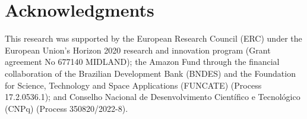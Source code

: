 \section*{Acknowledgments}
This research was supported by the European Research Council (ERC) under the European Union's Horizon 2020 research and innovation program (Grant agreement No 677140 MIDLAND); the Amazon Fund through the financial collaboration of the Brazilian Development Bank (BNDES) and the Foundation for Science, Technology and Space Applications (FUNCATE) (Process 17.2.0536.1); and Conselho Nacional de Desenvolvimento Científico e Tecnológico (CNPq) (Process 350820/2022-8).



\address{Rolf Simoes\\
  National Institute for Space Research (INPE)\\
  Avenida dos Astronautas, 1758, 12227-010, Sao Jose dos Campos\\
  Brazil\\
  ORCiD: \url{https://orcid.org/0000-0003-0953-4132}\\
  }

\address{Alber Sanchez\\
  National Institute for Space Research (INPE)\\
   Avenida dos Astronautas, 1758, 12227-010, Sao Jose dos Campos\\
  Brazil\\
  ORCiD: \url{https://orcid.org/0000-0001-7966-2880}\\
  }

\address{Michelle C. A. Picoli\\
  Earth and Life Institute, UCLouvain\\
  Place Louis Pasteur 3, 1348, Louvain-la-Neuve\\
  Belgium\\
  ORCiD: \url{https://orcid.org/0000-0001-9855-2046}\\
  }

\address{Patrick Meyfroidt\\
  Earth and Life Institute, UCLouvain\\
  Place Louis Pasteur 3, 1348, Louvain-la-Neuve\\
  Belgium\\
  ORCiD: \url{https://orcid.org/0000-0002-1047-9794}\\
  }
